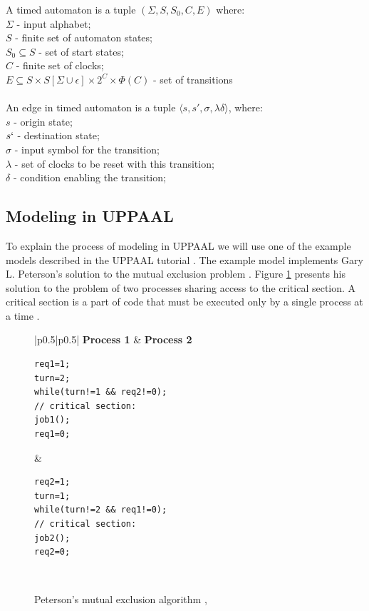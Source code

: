 \newpage
\begin{definition}
A timed automaton is a tuple $(\Sigma, S, S_0, C, E)$ where:\\
$\Sigma$ - input alphabet;\\
$S$ - finite set of automaton states;\\
$S_0 \subseteq S$ - set of start states; \\
$C$ - finite set of clocks; \\
$E \subseteq S \times S [\Sigma \cup {\epsilon}] \times 2^C \times \Phi(C)$ - set of transitions\\\\
An edge in timed automaton is a tuple $\langle s, s', \sigma, \lambda \delta \rangle$, where:\\
$s$ - origin state;\\
$s`$ - destination state;\\
$\sigma$ - input symbol for the transition;\\
$\lambda$ - set of clocks to be reset with this transition;\\
$\delta$ - condition enabling the transition;\\
\label{def:automaton}
\end{definition}


\subsection{Modeling in UPPAAL}
To explain the process of modeling in UPPAAL we will use one of the example models described in the UPPAAL tutorial \cite{SmallTutorial2009}. The example model implements Gary L. Peterson's solution to the mutual exclusion problem \cite{Peterson1981}. Figure \ref{fig:mutex_code} presents his solution to the problem of two processes sharing access to the critical section. A critical section is a part of code that must be executed only by a single process at a time \cite{Raynal2012}.

\begin{figure}[H]
\caption{Peterson’s mutual exclusion algorithm 
\label{fig:mutex_code}
\cite{SmallTutorial2009}, \cite{Peterson1981}}
\begin{tabular}{|p{}|p{}|}
\hline
\textbf{Process 1} & \textbf{Process 2} \\
\hline
\begin{lstlisting}[basicstyle=\ttfamily]
req1=1;
turn=2;
while(turn!=1 && req2!=0);
// critical section:
job1();
req1=0;
\end{lstlisting}
&
\begin{lstlisting}[basicstyle=\ttfamily]
req2=1;
turn=1;
while(turn!=2 && req1!=0);
// critical section:
job2();
req2=0;
\end{lstlisting}
\\
\hline
\end{tabular}
\end{figure}

